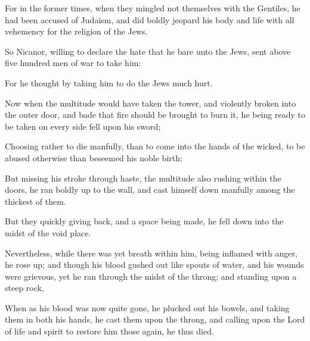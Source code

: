 {\par }{\PP {}For in the former times, when they mingled not themselves with the Gentiles, he had been accused of Judaism, and did boldly jeopard his body and life with all vehemency for the religion of the Jews.
\par }{\PP {}So Nicanor, willing to declare the hate that he bare unto the Jews, sent above five hundred men of war to take him:
\par }{\PP {}For he thought by taking him to do the Jews much hurt.
\par }{\PP {}Now when the multitude would have taken the tower, and violently broken into the outer door, and bade that fire should be brought to burn it, he being ready to be taken on every side fell upon his sword;
\par }{\PP {}Choosing rather to die manfully, than to come into the hands of the wicked, to be abused otherwise than beseemed his noble birth:
\par }{\PP {}But missing his stroke through haste, the multitude also rushing within the doors, he ran boldly up to the wall, and cast himself down manfully among the thickest of them.
\par }{\PP {}But they quickly giving back, and a space being made, he fell down into the midst of the void place.
\par }{\PP {}Nevertheless, while there was yet breath within him, being inflamed with anger, he rose up; and though his blood gushed out like spouts of water, and his wounds were grievous, yet he ran through the midst of the throng; and standing upon a steep rock,
\par }{\PP {}When as his blood was now quite gone, he plucked out his bowels, and taking them in both his hands, he cast them upon the throng, and calling upon the Lord of life and spirit to restore him those again, he thus died.

}
